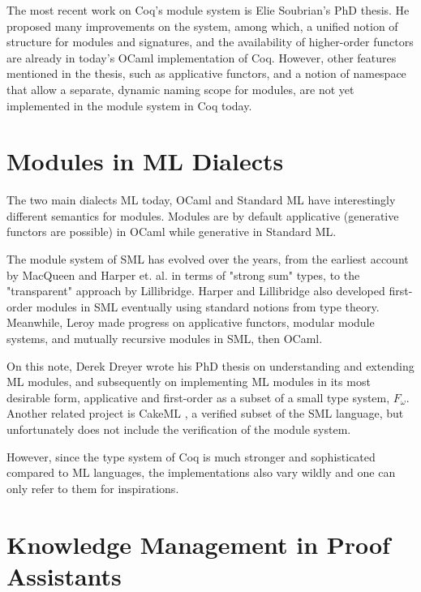 The most recent work on Coq's module system is Elie Soubrian's PhD thesis. He
proposed many improvements on the system, among which,
a unified notion of structure for modules and signatures, and the availability of
higher-order functors are already in today's OCaml implementation of Coq.
However, other features mentioned in the thesis, such as applicative functors,
and a notion of namespace that allow a separate, dynamic naming scope for modules,
are not yet implemented in the module system in Coq today.

\section{Modules in ML Dialects}
The two main dialects ML today, OCaml and Standard ML have interestingly
different semantics for modules. Modules are by default applicative (generative
functors are possible) in OCaml while generative in Standard ML.

The module system of SML has evolved over the years, from the earliest account
by MacQueen and Harper et. al. in terms of "strong sum"
types, to the "transparent" approach by Lillibridge. Harper and Lillibridge also
developed first-order modules in SML eventually using standard notions from type
theory. Meanwhile, Leroy made progress on applicative functors, modular module
systems, and mutually recursive modules in SML, then OCaml.

On this note, Derek Dreyer wrote his PhD thesis  on
understanding and extending ML modules, and subsequently on implementing ML
modules in its most desirable form, applicative and first-order as a subset of a
small type system, $F_\omega$. Another related project is 
CakeML , a verified subset of the SML language, but
unfortunately does not include the verification of the module system.

However, since the type system of Coq
is much stronger and sophisticated compared to ML languages, the
implementations also vary wildly and one can only refer to them for
inspirations.

\section{Knowledge Management in Proof Assistants}

